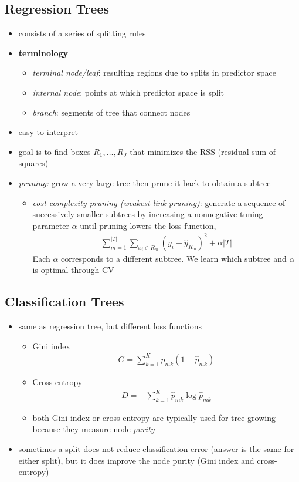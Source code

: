 \documentclass[10pt,a4paper]{article}
\begin{document}
\subsection{Regression Trees}
\begin{itemize}
	\item consists of a series of splitting rules
	\item \textbf{terminology}
	\begin{itemize}
		\item \textit{terminal node/leaf}: resulting regions due to splits in predictor space
		\item \textit{internal node}: points at which predictor space is split
		\item \textit{branch}: segments of tree that connect nodes	
	\end{itemize}
	\item easy to interpret
	\item goal is to find boxes $R_1, \ldots, R_J$ that minimizes the RSS (residual sum of squares)
	\item \textit{pruning:} grow a very large tree then prune it back to obtain a subtree
	\begin{itemize}
		\item \textit{cost complexity pruning (weakest link pruning)}: generate a sequence of successively smaller subtrees by increasing a nonnegative tuning parameter $\alpha$ until pruning lowers the loss function,
		\begin{align*}
			\sum_{m=1}^{|T|} \sum_{x_i \in R_m} (y_i - \hat{y}_{R_m})^2 + \alpha |T|
		\end{align*}
		Each $\alpha$ corresponds to a different subtree. We learn which subtree and $\alpha$ is optimal through CV
	\end{itemize}
\end{itemize}

\subsection{Classification Trees}
\begin{itemize}
	\item same as regression tree, but different loss functions
	\begin{itemize}
		\item Gini index
		\begin{align*}
			G = \sum_{k=1}^K \hat{p}_{mk}(1-\hat{p}_{mk})
		\end{align*}
		\item Cross-entropy
		\begin{align*}
			D = -\sum_{k=1}^K \hat{p}_{mk} \log{\hat{p}_{mk}}
		\end{align*}
		\item both Gini index or cross-entropy are typically used for tree-growing because they measure node \textit{purity}
	\end{itemize}
	\item sometimes a split does not reduce classification error (answer is the same for either split), but it does improve the node purity (Gini index and cross-entropy)
\end{itemize}
\end{document}
